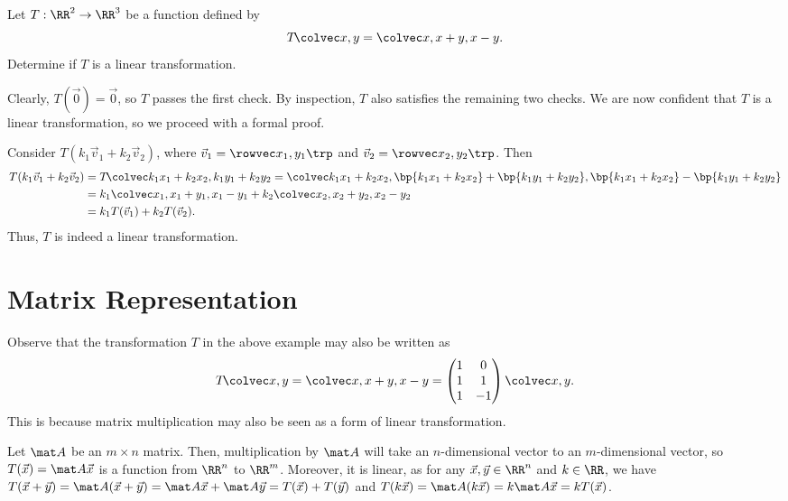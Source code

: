 \begin{sample}
    Let $T: \RR^2 \to \RR^3$ be a function defined by \[T\!\cvecii{x}{y} = \cveciii{x}{x+y}{x-y}.\] Determine if $T$ is a linear transformation. 
\end{sample}
Clearly, $T(\vec 0) = \vec 0$, so $T$ passes the first check. By inspection, $T$ also satisfies the remaining two checks. We are now confident that $T$ is a linear transformation, so we proceed with a formal proof.
\begin{sampans}
    Consider $T(k_1 \vec v_1 + k_2 \vec v_2)$, where $\vec v_1 = \cveciix{x_1}{y_1}$ and $\vec v_2 = \cveciix{x_2}{y_2}$. Then
    \begin{align*}
        T(k_1 \vec v_1 + k_2 \vec v_2) &= T\!\cvecii{k_1 x_1 + k_2 x_2}{k_1 y_1 + k_2 y_2} = \cveciii{k_1 x_1 + k_2 x_2}{\bp{k_1 x_1 + k_2 x_2} + \bp{k_1 y_1 + k_2 y_2}}{\bp{k_1 x_1 + k_2 x_2} - \bp{k_1 y_1 + k_2 y_2}}\\
        &= k_1\cveciii{x_1}{x_1 + y_1}{x_1 - y_1} + k_2 \cveciii{x_2}{x_2 + y_2}{x_2 - y_2}\\
        &= k_1 T(\vec v_1) + k_2 T(\vec v_2).
    \end{align*}
    Thus, $T$ is indeed a linear transformation.
\end{sampans}

\section{Matrix Representation}

Observe that the transformation $T$ in the above example may also be written as \[T\!\cvecii{x}{y} = \cveciii{x}{x+y}{x-y} = \begin{pmatrix}1 & 0 \\ 1 & 1 \\ 1 & -1\end{pmatrix} \cvecii{x}{y}.\] This is because matrix multiplication may also be seen as a form of linear transformation.

\begin{proposition}
    Let $\mat A$ be an $m \times n$ matrix. Then, multiplication by $\mat A$ will take an $n$-dimensional vector to an $m$-dimensional vector, so $T(\vec x) = \mat A \vec x$ is a function from $\RR^n$ to $\RR^m$. Moreover, it is linear, as for any $\vec x, \vec y \in \RR^n$ and $k \in \RR$, we have $T(\vec x + \vec y) = \mat A (\vec x + \vec y) = \mat A \vec x + \mat A \vec y = T(\vec x) + T(\vec y)$ and $T(k\vec x) = \mat A (k \vec x) = k \mat A \vec x = k T(\vec x)$.
\end{proposition}

